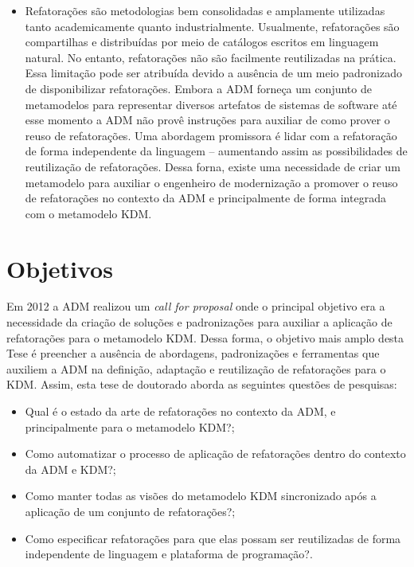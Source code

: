 \begin{itemize}
	\item Refatorações são metodologias bem consolidadas e amplamente utilizadas tanto academicamente quanto industrialmente. Usualmente, refatorações são compartilhas e distribuídas por meio de catálogos escritos em linguagem natural.
	No entanto, refatorações não são facilmente reutilizadas na prática. Essa limitação pode ser atribuída devido a ausência de um meio padronizado de disponibilizar refatorações. Embora a ADM forneça um conjunto de metamodelos para representar diversos artefatos de sistemas de software até esse momento a ADM não provê instruções para auxiliar de como prover o reuso de refatorações. Uma abordagem promissora é lidar com a refatoração de forma independente da linguagem – aumentando assim as possibilidades de reutilização de refatorações. Dessa forna, existe uma necessidade de criar um metamodelo para auxiliar o engenheiro de modernização a promover o reuso de refatorações no contexto da ADM e principalmente de forma integrada com o metamodelo KDM. 

\end{itemize}

\section{Objetivos}\label{sec:objetivos}

Em 2012 a ADM realizou um \emph{call for proposal} onde o principal objetivo era a necessidade da criação de soluções e padronizações para auxiliar a aplicação de refatorações para o metamodelo KDM. Dessa forma, o objetivo mais amplo desta Tese é preencher a ausência de abordagens, padronizações e ferramentas que auxiliem a ADM na definição, adaptação e reutilização de refatorações para o KDM. Assim, esta tese de doutorado aborda as seguintes questões de pesquisas:

\begin{itemize}
 	\item Qual é o estado da arte de refatorações no contexto da ADM, e principalmente para o metamodelo KDM?;
 	\item Como automatizar o processo de aplicação de refatorações dentro do contexto da ADM e KDM?;
 	\item Como manter todas as visões do metamodelo KDM sincronizado após a aplicação de um conjunto de refatorações?;
 	\item Como especificar refatorações para que elas possam ser reutilizadas de forma independente de linguagem e plataforma de programação?.
 \end{itemize} 


